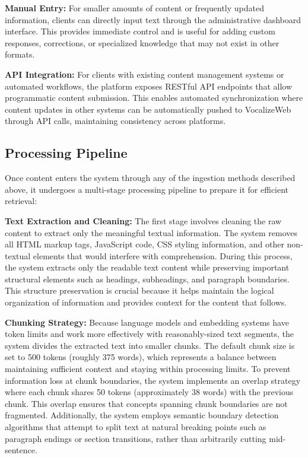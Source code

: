 \textbf{Manual Entry:} For smaller amounts of content or frequently updated information, clients can directly input text through the administrative dashboard interface. This provides immediate control and is useful for adding custom responses, corrections, or specialized knowledge that may not exist in other formats.

\textbf{API Integration:} For clients with existing content management systems or automated workflows, the platform exposes RESTful API endpoints that allow programmatic content submission. This enables automated synchronization where content updates in other systems can be automatically pushed to VocalizeWeb through API calls, maintaining consistency across platforms.

\subsection{Processing Pipeline}

Once content enters the system through any of the ingestion methods described above, it undergoes a multi-stage processing pipeline to prepare it for efficient retrieval:

\textbf{Text Extraction and Cleaning:}
The first stage involves cleaning the raw content to extract only the meaningful textual information. The system removes all HTML markup tags, JavaScript code, CSS styling information, and other non-textual elements that would interfere with comprehension. During this process, the system extracts only the readable text content while preserving important structural elements such as headings, subheadings, and paragraph boundaries. This structure preservation is crucial because it helps maintain the logical organization of information and provides context for the content that follows.

\textbf{Chunking Strategy:}
Because language models and embedding systems have token limits and work more effectively with reasonably-sized text segments, the system divides the extracted text into smaller chunks. The default chunk size is set to 500 tokens (roughly 375 words), which represents a balance between maintaining sufficient context and staying within processing limits. To prevent information loss at chunk boundaries, the system implements an overlap strategy where each chunk shares 50 tokens (approximately 38 words) with the previous chunk. This overlap ensures that concepts spanning chunk boundaries are not fragmented. Additionally, the system employs semantic boundary detection algorithms that attempt to split text at natural breaking points such as paragraph endings or section transitions, rather than arbitrarily cutting mid-sentence.

